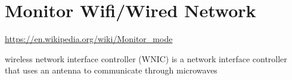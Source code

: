 \chapter{Monitor Wifi/Wired Network}


\url{https://en.wikipedia.org/wiki/Monitor_mode}

wireless network interface controller (WNIC) is a network interface controller
that uses an antenna to communicate through microwaves